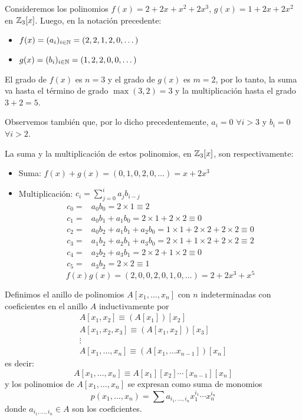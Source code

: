 \begin{fmd-example}
	Consideremos los polinomios $f(x) = 2 + 2x + x^2 + 2x^3$, $g(x)=1 + 2x + 2x^2$ en $\mathbb{Z}_3[x]$. Luego, en la notación precedente:
	\begin{itemize}
		\item $f(x) = (a_i)_{i\in \mathbb{N}} = (2, 2, 1, 2, 0, \dots)$
		\item $g(x) = (b_i)_{i \in \mathbb{N}} = (1, 2, 2, 0, 0, \dots)$
	\end{itemize}
	
	El grado de $f(x)$ es $n=3$ y el grado de $g(x)$ es $m=2$, por lo tanto, la suma va hasta el término de grado $\max(3, 2) = 3$ y la multiplicación hasta el grado $3 + 2 = 5$.
	
	Observemos también que, por lo dicho precedentemente, $a_i = 0$ $\forall i > 3$ y $b_i = 0$ $\forall i > 2$.
	
	La suma y la multiplicación de estos polinomios, en $\mathbb{Z}_3[x]$, son respectivamente:
	\begin{itemize}
		\item Suma: $f(x) + g(x) = (0, 1, 0, 2, 0, \dots) = x + 2x^3$
		\item Multiplicación: $c_i = \sum_{j=0}^{i} a_j b_{i-j}$
		\begin{align*}
			c_0 =& a_0b_0 = 2 \times 1 \equiv 2\\
			c_1 =& a_0b_1 + a_1b_0 = 2\times 1 + 2 \times 2 \equiv 0\\
			c_2 =& a_0b_2 + a_1b_1 + a_2b_0 = 1 \times 1 + 2 \times 2 + 2 \times 2 \equiv 0\\
			c_3 =& a_1b_2 + a_2b_1 + a_3b_0 = 2 \times 1 + 1 \times 2 + 2 \times 2 \equiv 2\\
			c_4 =& a_2b_2 + a_3b_1 = 2 \times 2 + 1 \times 2 \equiv 0\\
			c_5 =& a_3b_2 = 2 \times 2 \equiv 1
		\end{align*}
		\[f(x)g(x) = (2, 0, 0, 2, 0, 1, 0, \dots) = 2 + 2x^3 + x^5 \]
	\end{itemize}
	
\end{fmd-example}

\begin{fmd-definition}
	Definimos el anillo de polinomios $A[x_1, \dots, x_n]$ con $n$ indeterminadas con coeficientes en el anillo $A$ inductivamente por
	\[ \begin{array}{c}
		A[x_1, x_2] \equiv \left(A[x_1] \right)[x_2]\\
		A[x_1, x_2, x_3] \equiv \left(A[x_1, x_2] \right)[x_3]\\
		\vdots \\
		A[x_1, \dots, x_n] \equiv \left( A[x_1, \dots x_{n-1}] \right)[x_n]
	\end{array} \]
	es decir:
	\[ A[x_1, \dots, x_n] \equiv A[x_1][x_2]\cdots [x_{n-1}][x_n] \]
	y los polinomios de $A[x_1, \dots, x_n]$ se expresan como suma de monomios
	\[ p(x_1, \dots, x_n) = \sum a_{i_1,\dots, i_n}x_1^{i_1} \cdots x_n^{i_n} \]
	donde $a_{i_1,\dots, i_n} \in A$ son los coeficientes.
\end{fmd-definition}

